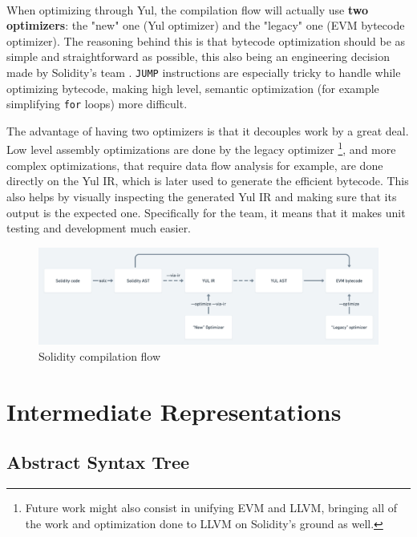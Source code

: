 \paragraph*{}
When optimizing through Yul, the compilation flow will actually use \textbf{two optimizers}: the "new" one (Yul optimizer) and the "legacy" one (EVM bytecode optimizer). The reasoning behind this is that bytecode optimization should be as simple and straightforward as possible, this also being an engineering decision made by Solidity's team \cite{solidity-summit-2022-hari}. \lstinline[columns=fixed]{JUMP} instructions are especially tricky to handle while optimizing bytecode, making high level, semantic optimization (for example simplifying \lstinline[columns=fixed]{for} loops) more difficult.

The advantage of having two optimizers is that it decouples work by a great deal. Low level assembly optimizations are done by the legacy optimizer \footnote[1]{Future work might also consist in unifying EVM and LLVM, bringing all of the work and optimization done to LLVM on Solidity's ground as well.}, and more complex optimizations, that require data flow analysis for example, are done directly on the Yul IR, which is later used to generate the efficient bytecode. This also helps by visually inspecting the generated Yul IR and making sure that its output is the expected one. Specifically for the team, it means that it makes unit testing and development much easier.

\begin{figure}
    \centering
    \includegraphics[width=15cm]{images/solc_flow.png}
    \caption{Solidity compilation flow}
    \label{fig:solc-compilation-flow}
\end{figure}

\section{Intermediate Representations}

\subsection*{Abstract Syntax Tree}
